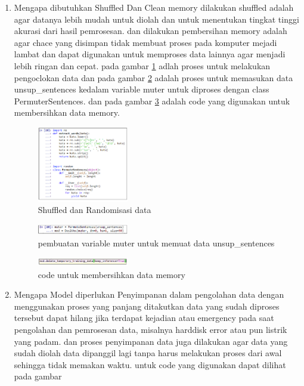 \begin{enumerate}
        \item Mengapa dibutuhkan Shuffled Dan Clean memory
        \subitem dilakukan shuffled adalah agar datanya lebih mudah untuk diolah dan untuk menentukan tingkat tinggi akurasi dari hasil pemrosesan. dan dilakukan pembersihan memory adalah agar chace yang disimpan tidak membuat proses pada komputer mejadi lambat dan dapat digunakan untuk memproses data lainnya agar menjadi lebih ringan dan cepat.
        pada gambar \ref{l7} adlah proses untuk melakukan pengoclokan data dan pada gambar \ref{l8} adalah proses untuk memasukan data unsup\_sentences kedalam variable muter untuk diproses dengan class PermuterSentences. dan pada gambar \ref{l9} adalah code yang digunakan untuk membersihkan data memory.
        \begin{figure}[H]
            \includegraphics[width=4cm]{figures/1174015/5/23.png}
            \centering
            \caption{Shuffled dan Randomisasi data }
            \label{l7}
        \end{figure}
        \begin{figure}[H]
            \includegraphics[width=4cm]{figures/1174015/5/24.png}
            \centering
            \caption{pembuatan variable muter untuk memuat data unsup\_sentences}
            \label{l8}
        \end{figure}
        \begin{figure}[H]
            \includegraphics[width=4cm]{figures/1174015/5/25.png}
            \centering
            \caption{code untuk membersihkan data memory}
            \label{l9}
        \end{figure}
        
        
        \item Mengapa Model diperlukan Penyimpanan
        \subitem dalam pengolahan data dengan menggunakan proses yang panjang ditakutkan data yang sudah diproses tersebut dapat hilang jika terdapat kejadian atau emergency pada saat pengolahan dan pemrosesan data, misalnya harddisk error atau pun listrik yang padam. dan proses penyimpanan data juga dilakukan agar data yang sudah diolah data dipanggil lagi tanpa harus melakukan proses dari awal sehingga tidak memakan waktu. untuk code yang digunakan dapat dilihat pada gambar
        

\end{enumerate}

